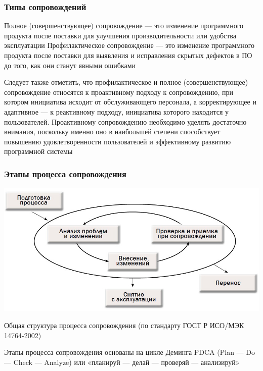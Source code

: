 \documentclass{../industrial-development}
\begin{document}
\begin{frame} \frametitle{Типы сопровождений}
	\begin{definition}
		\alert{Полное (совершенствующее) сопровождение} --- это изменение программного продукта после поставки для улучшения производительности или удобства эксплуатации
		\newline
		\newline
		\alert{Профилактическое сопровождение} ---  это изменение программного продукта после поставки для выявления и исправления скрытых дефектов в ПО до того, как они станут явными ошибками
	\end{definition}
\end{frame}

\lecturenotes
Следует также отметить, что профилактическое и полное (совершенствующее) сопровождение относятся к проактивному подходу к сопровождению, при котором инициатива исходит от обслуживающего персонала, а корректирующее и адаптивное — к реактивному подходу, инициатива которого находится у пользователей.
Проактивному сопровождению необходимо уделять достаточно внимания, поскольку именно оно в наибольшей степени способствует повышению удовлетворенности пользователей и эффективному развитию программной системы

\begin{frame} \frametitle{Этапы процесса сопровождения}
\centerline{\includegraphics[width=\textwidth]{21.jpg}}
Общая структура процесса сопровождения (по стандарту ГОСТ Р ИСО/МЭК 14764-2002)
\end{frame}
\lecturenotes
Этапы процесса сопровождения основаны на цикле Деминга PDCA (Plan — Do — Check — Analyze) или «планируй — делай — проверяй — анализируй»

\end{document}
